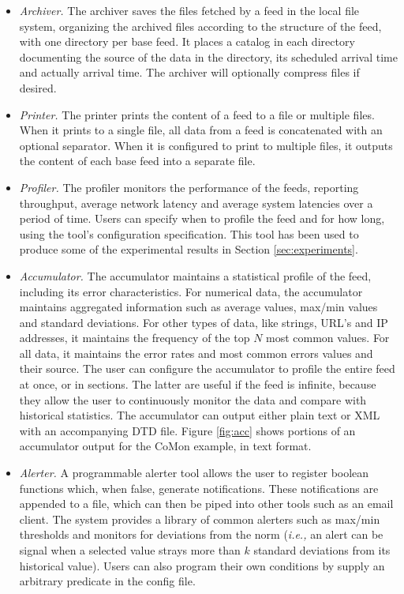 \begin{itemize}
\item {\em Archiver.} The archiver saves the files fetched by a feed 
in the local file system, organizing the archived files
according to the structure of the feed, with one directory per base feed. 
It places a catalog in each directory documenting the source of 
the data in the directory, its scheduled arrival time and
actually arrival time. The archiver will optionally compress
files if desired.

\item {\em Printer.} The printer prints the content of a feed to a file or
multiple files. When it prints to a single file, all data from a feed is
concatenated with an optional separator. When it is configured to print
to multiple files, it outputs the content of each base feed into a separate
file.

\item {\em Profiler.} The profiler monitors the performance of the feeds, reporting
throughput, average network latency and average system latencies
over a period of time. Users can specify when to profile the feed and
for how long, using the tool's configuration specification. 
This tool has been used to produce some of the experimental 
results in Section \ref{sec:experiments}.

\item {\em Accumulator.} The accumulator maintains a statistical profile of the feed, including its error characteristics. For numerical data, the accumulator maintains aggregated information such as 
average values, max/min values and standard deviations. For other
types of data, like strings, URL's and IP addresses, it maintains the frequency of the top $N$
most common values. For all data, it maintains the error rates and most common errors values and their source.
The user can configure the accumulator to profile the entire feed at once, or in sections. The latter are
useful if the feed is infinite, because they allow the user to continuously monitor the data and compare with historical statistics. 
The accumulator can output either plain text or XML with an
accompanying DTD file. Figure \ref{fig:acc} shows portions of an accumulator
output for the CoMon example, in text format.

\item {\em Alerter.} A programmable alerter tool allows the user to register boolean 
functions which, when false, generate notifications.  These notifications are appended to
a file, which can then be piped into other tools such as an email
client.  The system provides a library of 
common alerters such as max/min thresholds and monitors for deviations from the norm
({\em i.e.,} an alert can be signal when a selected value strays more than $k$
standard deviations from its historical value). 
Users can also program their own conditions by supply an arbitrary \ocaml{} predicate
in the config file.  


\end{itemize}
